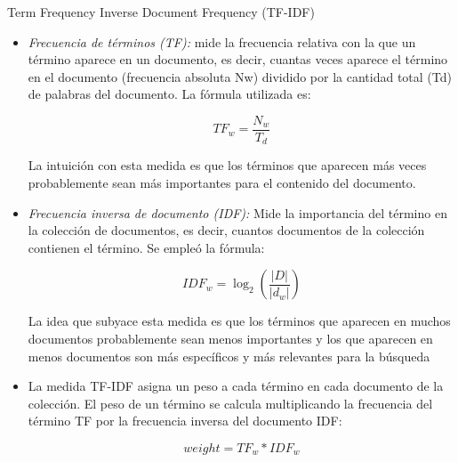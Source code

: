 \documentclass{beamer}
\begin{document}
\begin{frame}{Term Frequency Inverse Document Frequency (TF-IDF)}
	\begin{itemize}
		\item \emph{Frecuencia de términos (TF):} mide la frecuencia relativa con la que un término aparece
		en un documento, es decir, cuantas veces aparece el término en el documento
		(frecuencia absoluta Nw) dividido por la cantidad total (Td) de palabras del documento. La
		fórmula utilizada es:
		
		\begin{center}    
			\begin{equation}
				TF_w = \frac{N_w}{T_d}
			\end{equation}
		\end{center}
		La intuición con esta medida es que los términos que aparecen más veces
		probablemente sean más importantes para el contenido del documento.
		
		\pause
		\item \emph{Frecuencia inversa de documento (IDF):} Mide la importancia del término en la colección
		de documentos, es decir, cuantos documentos de la colección contienen el término.
		Se empleó la fórmula:
		\begin{center}
			\begin{equation}
				IDF_w = \log_2(\frac{|D|}{|d_w|})   
			\end{equation}
		\end{center}
		La idea que subyace esta medida es que los términos que aparecen en muchos
		documentos probablemente sean menos importantes y los que aparecen en menos
		documentos son más específicos y más relevantes para la búsqueda
		
		\pause
		\item La medida TF-IDF asigna un peso a cada término en cada documento de la colección. El peso
		de un término se calcula multiplicando la frecuencia del término TF por la frecuencia inversa del
		documento IDF:
		\begin{center}
			\begin{equation}
				weight = TF_w * IDF_w 
			\end{equation}
		\end{center}
		
	\end{itemize}
	
\end{frame}
\end{document}
